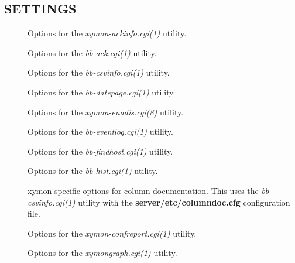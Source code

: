 \subsection{SETTINGS}
\begin{description}
\item[] Options for the \emph{xymon-ackinfo.cgi(1)}
 utility. 

 

\item[] Options for the \emph{bb-ack.cgi(1)}
 utility. 

 

\item[] Options for the \emph{bb-csvinfo.cgi(1)}
 utility. 

 

\item[] Options for the \emph{bb-datepage.cgi(1)}
 utility. 

 

\item[] Options for the \emph{xymon-enadis.cgi(8)}
 utility. 

 

\item[] Options for the \emph{bb-eventlog.cgi(1)}
 utility. 

 

\item[] Options for the \emph{bb-findhost.cgi(1)}
 utility. 

 

\item[] Options for the \emph{bb-hist.cgi(1)}
 utility. 



\item[] xymon-specific options for column documentation. This uses the \emph{bb-csvinfo.cgi(1)}
 utility with the \textbf{server/etc/columndoc.cfg}
 configuration file. 

 

\item[] Options for the \emph{xymon-confreport.cgi(1)}
 utility. 

 

\item[] Options for the \emph{xymongraph.cgi(1)}
 utility. 


\end{description}
